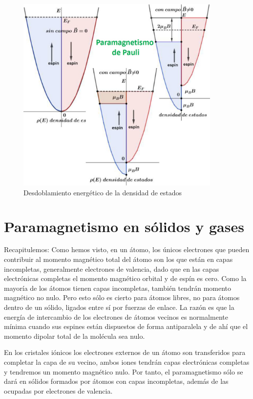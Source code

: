\begin{figure}[H]
    \centering
    \includegraphics[width=0.9\textwidth]{./Figures/fig_s16}
	\caption{Desdoblamiento energético de la densidad de estados}
	\label{fig:s16}
\end{figure}





\section{Paramagnetismo en sólidos y gases}

Recapitulemos: Como hemos visto, en un átomo, los únicos electrones que pueden contribuir al momento magnético total del átomo son los que están en capas incompletas, generalmente electrones de valencia, dado que en las capas electrónicas completas el momento magnético orbital y de espín es cero. Como la mayoría de los átomos tienen capas incompletas, también tendrán momento magnético no nulo. Pero esto sólo es cierto para átomos libres, no para átomos dentro de un sólido, ligados entre sí por fuerzas de enlace. La razón es que la energía de intercambio de los electrones de átomos vecinos es normalmente mínima cuando sus espines están dispuestos de forma antiparalela y de ahí que el momento dipolar total de la molécula sea nulo.

En los cristales iónicos los electrones externos de un átomo son transferidos para completar la capa de su vecino, ambos iones tendrán capas electrónicas completas y tendremos un momento magnético nulo. Por tanto, el paramagnetismo sólo se dará en sólidos formados por átomos con capas incompletas, además de las ocupadas por electrones de valencia.

